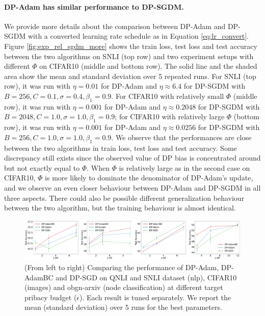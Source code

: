 \documentclass[letterpaper]{article} %
\begin{document}
\paragraph{DP-Adam has similar performance to DP-SGDM.}
We provide more details about the comparison between DP-Adam and DP-SGDM with a converted learning rate schedule as in Equation \ref{eq:lr_convert}. Figure \ref{fig:exp_rel_sgdm_more} shows the train loss, test loss and test accuracy between the two algorithms on SNLI (top row) and two experiment setups with different $\Phi$ on CIFAR10 (middle and bottom row). The solid line and the shaded area show the mean and standard deviation over 5 repeated runs. For SNLI (top row), it was run with $\eta=0.01$ for DP-Adam and $\eta \approx 6.4$ for DP-SGDM with $B=256, C=0.1, \sigma=0.4, \beta_1=0.9$. For CIFAR10 with relatively small $\Phi$ (middle row), it was run with $\eta=0.001$ for DP-Adam and $\eta\approx0.2048$ for DP-SGDM with $B=2048, C=1.0, \sigma=1.0, \beta_1=0.9$; for CIFAR10 with relatively large $\Phi$ (bottom row), it was run with $\eta=0.001$ for DP-Adam and $\eta \approx0.0256$ for DP-SGDM with $B=256, C=1.0, \sigma=1.0, \beta_1=0.9$. We observe that the performances are close between the two algorithms in train loss, test loss and test accuracy. Some discrepancy still exists since the observed value of DP bias is concentrated around but not exactly equal to $\Phi$. When $\Phi$ is relatively large as in the second case on CIFAR10, $\Phi$ is more likely to dominate the denominator of DP-Adam's update, and we observe an even closer behaviour between DP-Adam and DP-SGDM in all three aspects. There could also be possible different generalization behaviour between the two algorithm, but the training behaviour is almost identical.

\begin{figure}[t]
\centering
\includegraphics[width=0.9\linewidth]{figs/multi_eps_lineplot.pdf}
\caption{(From left to right) Comparing the performance of DP-Adam, DP-AdamBC and DP-SGD on QNLI and SNLI dataset (nlp), CIFAR10 (images) and obgn-arxiv (node classification) at different target pribacy budget ($\epsilon$). Each result is tuned separately. We report the mean (standard deviation) over 5 runs for the best parameters.}
\label{fig:res_multi_eps}
\end{figure}
\end{document}
